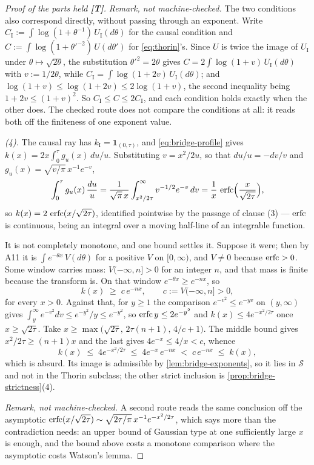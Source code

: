 \begin{proof}[Proof of the parts held \textbf{[T]}]
\emph{Remark, not machine-checked.} The two conditions also correspond directly, without passing
through an exponent. Write
$C_{\mathrm I} := \int\log(1 + \theta^{-1})\,U_{\mathrm I}(d\theta)$ for the causal condition and
$C := \int\log(1 + \theta'^{-2})\,U(d\theta')$ for \ref{eq:thorin}'s. Since $U$ is twice the image
of $U_{\mathrm I}$ under $\theta \mapsto \sqrt{2\theta}$, the substitution $\theta'^2 = 2\theta$
gives $C = 2\int\log(1 + v)\,U_{\mathrm I}(d\theta)$ with $v := 1/2\theta$, while
$C_{\mathrm I} = \int\log(1 + 2v)\,U_{\mathrm I}(d\theta)$; and
$\log(1+v) \le \log(1+2v) \le 2\log(1+v)$, the second inequality being $1 + 2v \le (1+v)^2$. So
$C_{\mathrm I} \le C \le 2C_{\mathrm I}$, and each condition holds exactly when the other does.
The checked route does not compare the conditions at all: it reads both off the finiteness of one
exponent value.

\emph{(4).} The causal ray has $k_{\mathrm I} = \mathbf 1_{(0,\tau)}$, and
\ref{eq:bridge-profile} gives $k(x) = 2x\int_0^\tau g_u(x)\,du/u$. Substituting $v = x^2/2u$,
so that $du/u = -dv/v$ and $g_u(x) = \sqrt{v/\pi}\,x^{-1}e^{-v}$,
\[
  \int_0^\tau g_u(x)\,\frac{du}{u}
  = \frac{1}{\sqrt\pi\,x}\int_{x^2/2\tau}^\infty v^{-1/2}e^{-v}\,dv
  = \frac{1}{x}\,\operatorname{erfc}\Bigl(\frac{x}{\sqrt{2\tau}}\Bigr),
\]
so $k(x) = 2\,\operatorname{erfc}(x/\sqrt{2\tau})$, identified pointwise by the passage of clause (3) ---
$\operatorname{erfc}$ is continuous, being an integral over a moving half-line of an integrable function.

It is not completely monotone, and one bound settles it. Suppose it were; then by A11 it is
$\int e^{-\theta x}\,V(d\theta)$ for a positive $V$ on $[0,\infty)$, and $V \ne 0$ because
$\operatorname{erfc} > 0$. Some window carries mass: $V(-\infty, n] > 0$ for an integer $n$, and that mass is
finite because the transform is. On that window $e^{-\theta x} \ge e^{-nx}$, so
\[
  k(x) \;\ge\; c\,e^{-nx}, \qquad c := V(-\infty,n] > 0,
\]
for every $x > 0$. Against that, for $y \ge 1$ the comparison $e^{-v^2} \le e^{-yv}$ on
$(y,\infty)$ gives $\int_y^\infty e^{-v^2}dv \le e^{-y^2}/y \le e^{-y^2}$, so
$\operatorname{erfc} y \le 2e^{-y^2}$ and $k(x) \le 4e^{-x^2/2\tau}$ once $x \ge \sqrt{2\tau}$. Take
$x \ge \max\bigl(\sqrt{2\tau},\,2\tau(n+1),\,4/c + 1\bigr)$. The middle bound gives
$x^2/2\tau \ge (n+1)x$ and the last gives $4e^{-x} \le 4/x < c$, whence
\[
  k(x) \;\le\; 4e^{-x^2/2\tau} \;\le\; 4e^{-x}\,e^{-nx} \;<\; c\,e^{-nx} \;\le\; k(x),
\]
which is absurd. Its image is admissible by
\ref{lem:bridge-exponents}, so it lies in $\mathcal{S}$ and not in the Thorin subclass; the
other strict inclusion is \ref{prop:bridge-strictness}(4).

\emph{Remark, not machine-checked.} A second route reads the same conclusion off the
asymptotic $\operatorname{erfc}(x/\sqrt{2\tau}) \sim \sqrt{2\tau/\pi}\,x^{-1}e^{-x^2/2\tau}$, which says more
than the contradiction needs: an upper bound of Gaussian type at one sufficiently large $x$ is
enough, and the bound above costs a monotone comparison where the asymptotic costs Watson's
lemma.
\end{proof}

